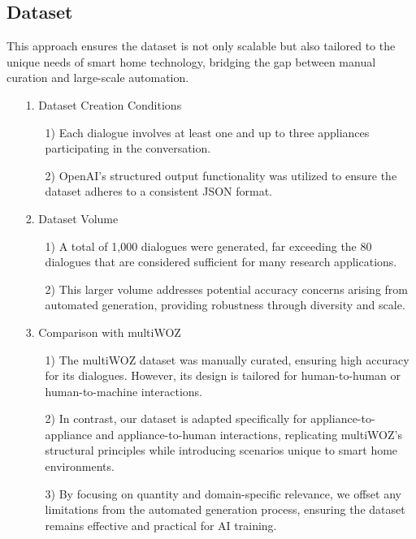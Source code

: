 \documentclass[conference]{IEEEtran}
\begin{document}
\subsection{Dataset}

This approach ensures the dataset is not only scalable but also tailored to the unique needs of smart home technology, bridging the gap between manual curation and large-scale automation. \\

\begin{itemize} 
    \item [1.] Dataset Creation Conditions
    \begin{enumerate}
        \item[1)] Each dialogue involves at least one and up to three appliances participating in the conversation.
        \item[2)] OpenAI's structured output functionality was utilized to ensure the dataset adheres to a consistent JSON format. \\
    \end{enumerate}
\end{itemize}

\begin{itemize}
    \item [2.] Dataset Volume
    \begin{enumerate}
    \item[1)] A total of 1,000 dialogues were generated, far exceeding the 80 dialogues that are considered sufficient for many research applications.
    \item[2)] This larger volume addresses potential accuracy concerns arising from automated generation, providing robustness through diversity and scale. \\
    \end{enumerate}
\end{itemize}


\begin{itemize}
    \item [3.] Comparison with multiWOZ
    \begin{enumerate}
    \item[1)] The multiWOZ dataset was manually curated, ensuring high accuracy for its dialogues. However, its design is tailored for human-to-human or human-to-machine interactions.
    \item[2)] In contrast, our dataset is adapted specifically for appliance-to-appliance and appliance-to-human interactions, replicating multiWOZ’s structural principles while introducing scenarios unique to smart home environments.
    \item[3)] By focusing on quantity and domain-specific relevance, we offset any limitations from the automated generation process, ensuring the dataset remains effective and practical for AI training. \\
    \end{enumerate}
\end{itemize}
\end{document}
